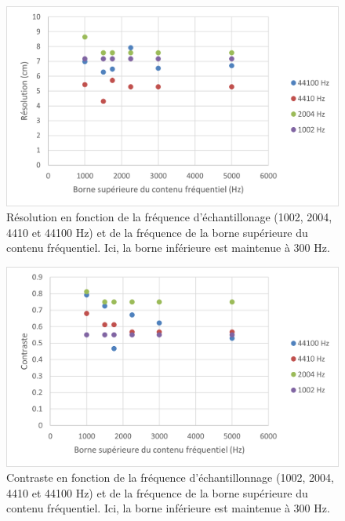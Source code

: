 \documentclass[11pt,letterpaper]{article}
\begin{document}
\begin{figure}[H]
    \centering
    \includegraphics[scale=0.8]{resolution_interdependance.png}
    \caption{Résolution en fonction de la fréquence d'échantillonage
    (1002, 2004, 4410 et 44100 Hz) et de la fréquence de la borne supérieure du contenu fréquentiel.
    Ici, la borne inférieure est maintenue à 300 Hz.}
    \label{res_interdep}
\end{figure}
\begin{figure}[H]
    \centering
    \includegraphics[scale=0.8]{contraste_interdependance.png}
    \caption{Contraste en fonction de la fréquence d'échantillonnage
    (1002, 2004, 4410 et 44100 Hz) et de la fréquence de la borne supérieure du contenu fréquentiel.
    Ici, la borne inférieure est maintenue à 300 Hz.}
    \label{contraste_interdep}
\end{figure}
\end{document}
